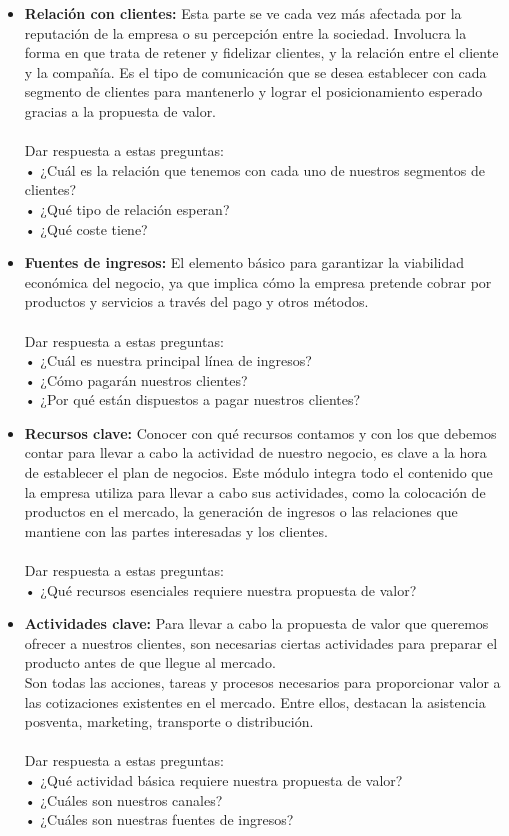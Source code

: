\documentclass[preprint,12pt]{elsarticle}
\begin{document}
\begin{itemize}
	\item {\textbf{Relación con clientes: }} Esta parte se ve cada vez más afectada por la reputación de la empresa o su percepción entre la sociedad. Involucra la forma en que trata de retener y fidelizar clientes, y la relación entre el cliente y la compañía. Es el tipo de comunicación que se desea establecer con cada segmento de clientes para mantenerlo y lograr el posicionamiento esperado gracias a la propuesta de valor.  \\\\Dar respuesta a estas preguntas:\\ • ¿Cuál es la relación que tenemos con cada uno de nuestros segmentos de clientes? \\ • ¿Qué tipo de relación esperan? \\ • ¿Qué coste tiene?

	\item {\textbf{Fuentes de ingresos: }} El elemento básico para garantizar la viabilidad económica del negocio, ya que implica cómo la empresa pretende cobrar por productos y servicios a través del pago y otros métodos. \\\\Dar respuesta a estas preguntas:\\ • ¿Cuál es nuestra principal línea de ingresos?\\ • ¿Cómo pagarán nuestros clientes? \\ • ¿Por qué están dispuestos a pagar nuestros clientes? 

	\item {\textbf{Recursos clave: }} Conocer con qué recursos contamos y con los que debemos contar para llevar a cabo la actividad de nuestro negocio, es clave a la hora de establecer el plan de negocios. Este módulo integra todo el contenido que la empresa utiliza para llevar a cabo sus actividades, como la colocación de productos en el mercado, la generación de ingresos o las relaciones que mantiene con las partes interesadas y los clientes.\cite{referenciasosa3} \\\\Dar respuesta a estas preguntas:\\ • ¿Qué recursos esenciales requiere nuestra propuesta de valor?
	\item {\textbf{Actividades clave: }}Para llevar a cabo la propuesta de valor que queremos ofrecer a nuestros clientes, son necesarias ciertas actividades para preparar el producto antes de que llegue al mercado. \\Son todas las acciones, tareas y procesos necesarios para proporcionar valor a las cotizaciones existentes en el mercado. Entre ellos, destacan la asistencia posventa, marketing, transporte o distribución.\cite{referenciasosa3}  \\\\Dar respuesta a estas preguntas:\\ • ¿Qué actividad básica requiere nuestra propuesta de valor? \\ • ¿Cuáles son nuestros canales? \\ • ¿Cuáles son nuestras fuentes de ingresos?


\end{itemize}
\end{document}
